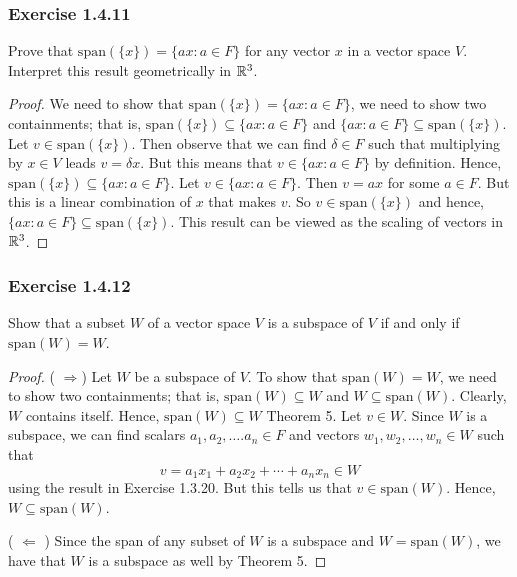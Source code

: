 \subsubsection{Exercise 1.4.11} Prove that \( \text{span}(\{x\} ) = \{ ax : a \in F  \}  \) for any vector \( x  \) in a vector space \( V  \). Interpret this result geometrically in \( \mathbb{R}^{3} \).
\begin{proof}
We need to show that \( \text{span}(\{ x \} ) = \{ a x : a \in F  \}  \), we need to show two containments; that is, \( \text{span}(\{ x \} ) \subseteq \{ ax : a \in F  \}  \) and \( \{ ax : a \in F  \} \subseteq \text{span}(\{ x \} ) \). Let \( v \in \text{span}(\{ x \} ) \). Then observe that we can find \( \delta \in F  \) such that multiplying by \( x \in V  \) leads \( v = \delta x     \). But this means that \( v \in \{ ax : a \in F  \}  \) by definition. Hence, \( \text{span}(\{ x \} ) \subseteq \{ ax : a \in F  \}    \). Let \( v \in \{ ax : a \in F  \}  \). Then \( v = a x  \) for some \( a \in F  \). But this is a linear combination of \( x  \) that makes \( v  \). So \( v \in \text{span}(\{ x \} ) \) and hence, \( \{ ax : a \in F  \} \subseteq \text{span}(\{ x \} ) \). This result can be viewed as the scaling of vectors in \( \mathbb{R}^{3} \).
\end{proof}

\subsubsection{Exercise 1.4.12} Show that a subset \( W  \) of a vector space \( V  \) is a subspace of \( V  \) if and only if \( \text{span}(W) = W  \). 

\begin{proof}
    ( \( \Rightarrow \)) Let \( W  \) be a subspace of \( V  \). To show that \( \text{span}(W) = W  \), we need to show two containments; that is, \( \text{span}(W) \subseteq W  \) and \( W \subseteq \text{span}(W) \). Clearly, \( W  \) contains itself. Hence, \( \text{span}(W) \subseteq W  \) Theorem 5. Let \( v \in W  \). Since \( W  \) is a subspace, we can find scalars \( a_{1} , a_{2} , \dots. a_{n} \in F  \) and vectors \( w_{1} , w_{2} , \dots, w_{n} \in W  \) such that 
    \[  v = a_{1} x_{1} + a_{2} x_{2} + \cdots + a_{n} x_{n} \in W \]
    using the result in Exercise 1.3.20. But this tells us that \( v \in \text{span}(W) \). Hence, \( W \subseteq \text{span}(W) \).

    ( \( \Leftarrow \) ) Since the span of any subset of \(  W   \) is a subspace and \( W = \text{span}(W)  \), we have that \( W  \) is a subspace as well by Theorem 5.
\end{proof}


